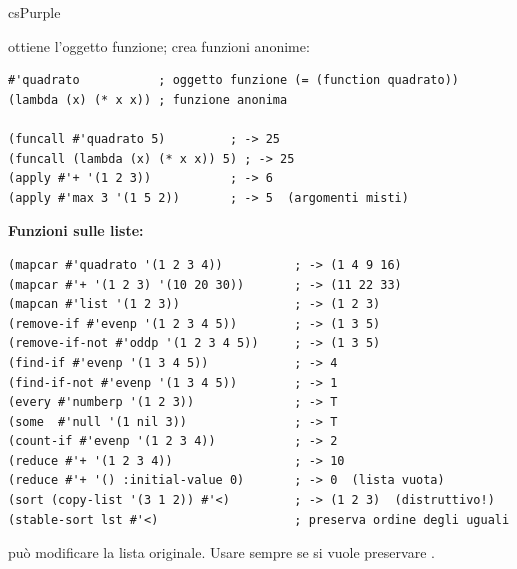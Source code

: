 
\begin{refbox}{csPurple}
\label{sec:higherorder}

 ottiene l'oggetto funzione;  crea funzioni anonime:

\begin{lstlisting}
#'quadrato           ; oggetto funzione (= (function quadrato))
(lambda (x) (* x x)) ; funzione anonima

(funcall #'quadrato 5)         ; -> 25
(funcall (lambda (x) (* x x)) 5) ; -> 25
(apply #'+ '(1 2 3))           ; -> 6
(apply #'max 3 '(1 5 2))       ; -> 5  (argomenti misti)
\end{lstlisting}

\textbf{Funzioni sulle liste:}\nopagebreak
\begin{lstlisting}
(mapcar #'quadrato '(1 2 3 4))          ; -> (1 4 9 16)
(mapcar #'+ '(1 2 3) '(10 20 30))       ; -> (11 22 33)
(mapcan #'list '(1 2 3))                ; -> (1 2 3)
(remove-if #'evenp '(1 2 3 4 5))        ; -> (1 3 5)
(remove-if-not #'oddp '(1 2 3 4 5))     ; -> (1 3 5)
(find-if #'evenp '(1 3 4 5))            ; -> 4
(find-if-not #'evenp '(1 3 4 5))        ; -> 1
(every #'numberp '(1 2 3))              ; -> T
(some  #'null '(1 nil 3))               ; -> T
(count-if #'evenp '(1 2 3 4))           ; -> 2
(reduce #'+ '(1 2 3 4))                 ; -> 10
(reduce #'+ '() :initial-value 0)       ; -> 0  (lista vuota)
(sort (copy-list '(3 1 2)) #'<)         ; -> (1 2 3)  (distruttivo!)
(stable-sort lst #'<)                   ; preserva ordine degli uguali
\end{lstlisting}

\begin{refnote}
 può modificare la lista originale. Usare sempre
 se si vuole preservare .
\end{refnote}

\end{refbox}

